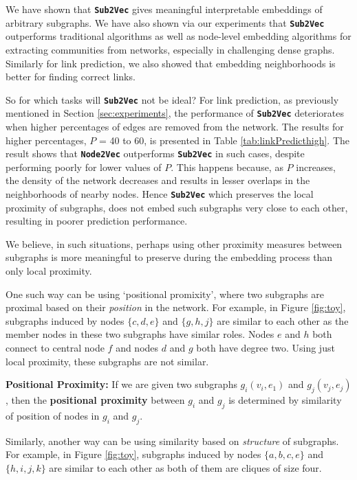 \documentclass[sigconf]{acmart}
\newcommand{\alg}{{\bf {\tt Sub2Vec}}\xspace}
\newcommand{\nodevec}{{\bf {\tt Node2Vec}}\xspace}
\begin{document}
We have shown that \alg gives meaningful interpretable embeddings of arbitrary subgraphs. We have also shown via our experiments that \alg outperforms traditional algorithms as well as node-level embedding algorithms for extracting communities from networks, especially in challenging dense graphs. Similarly for link prediction, we also showed that embedding neighborhoods is better for finding correct links.

So for which tasks will \alg not be ideal? For link prediction, as previously mentioned in Section \ref{sec:experiments}, the performance of \alg deteriorates when higher percentages of edges are removed from the network. The results for higher percentages, $P$ = 40 to 60, is presented in Table \ref{tab:linkPredicthigh}. The result shows that \nodevec outperforms \alg in such cases, despite performing poorly for lower values of $P$. 
This happens because, as $P$ increases, the density of the network decreases and results in lesser overlaps in the neighborhoods of nearby nodes. Hence \alg which preserves the local proximity of subgraphs, does not embed such subgraphs very close to each other, resulting in poorer prediction performance.
 
We believe, in such situations, perhaps using other proximity measures between subgraphs is more meaningful to preserve during the embedding process than only local proximity. 

One such way can be using `positional promixity', where two subgraphs are proximal based on their \emph{position} in the network. For example, in Figure \ref{fig:toy}, subgraphs induced by nodes  $\{c, d, e\}$ and $\{g, h, j\}$ are similar to each other as the member nodes in these two subgraphs have similar roles. Nodes $e$ and $h$ both connect to central node $f$ and nodes $d$ and $g$ both have degree two. Using just local proximity, these subgraphs are not similar. 
\par \noindent 
\textbf{Positional Proximity:} If we are given two subgraphs $g_i(v_i, e_1)$ and $g_j(v_j, e_j)$, then the \textbf{positional proximity} between $g_i$ and $g_j$ is determined by similarity of position of nodes in $g_i$ and $g_j$. 

 

Similarly, another way can be using similarity based on \emph{structure} of subgraphs. For example, in Figure \ref{fig:toy}, subgraphs induced by nodes $\{a, b, c, e \}$ and $\{h, i, j, k\}$ are similar to each other as both of them are cliques of size four.
\end{document}
